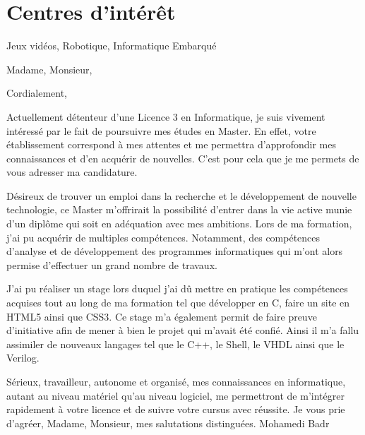 \documentclass[a4paper]{moderncv}
\begin{document}
  \section{Centres d'intérêt}
    Jeux vidéos, Robotique, Informatique Embarqué


  \clearpage

  \date{\today}
  \opening{Madame, Monsieur,}
  \closing{Cordialement,}

  \makelettertitle 
\justify
\hspace{1cm}Actuellement détenteur d’une Licence 3 en Informatique, je suis vivement intéressé par le fait de poursuivre mes études en Master. En effet, votre établissement correspond à mes attentes et me permettra d’approfondir mes connaissances et d’en acquérir de nouvelles. C’est pour cela que je me permets de vous adresser ma candidature.
\\\par
\setlength{\parindent}{1cm}Désireux de trouver un emploi dans la recherche et le développement de nouvelle technologie, ce 
Master m'offrirait la possibilité d'entrer dans la vie active munie d'un diplôme qui soit en adéquation avec mes ambitions.
Lors de ma formation, j’ai pu acquérir de multiples compétences. Notamment, des compétences d'analyse et de développement des programmes informatiques qui m’ont alors permise d’effectuer un grand nombre de travaux.
\\\par
\setlength{\parindent}{1cm}J’ai pu réaliser un stage lors duquel j’ai dû mettre en pratique les compétences acquises tout au long de ma formation tel que développer en C, faire un site en HTML5 ainsi que CSS3. Ce stage m’a également permit de faire preuve d’initiative afin de mener à bien le projet qui m’avait été confié. Ainsi il m’a fallu assimiler de nouveaux langages tel que le C++, le Shell, le VHDL ainsi que le Verilog.
\\\par
\setlength{\parindent}{1cm}Sérieux, travailleur, autonome et organisé, mes connaissances en informatique, autant au niveau matériel qu’au niveau logiciel, me permettront de m’intégrer rapidement à votre licence et de suivre votre cursus avec réussite.
Je vous prie d'agréer, Madame, Monsieur, mes salutations distinguées.
Mohamedi Badr
  \makeletterclosing
\end{document}
